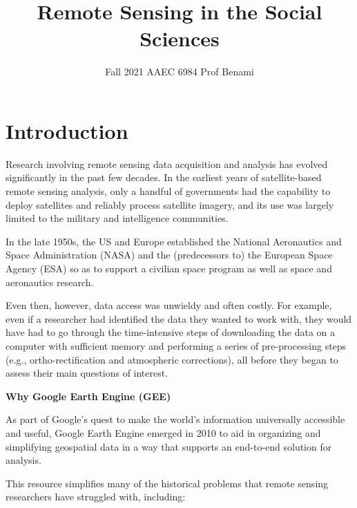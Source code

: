 \documentclass[
]{article}
\title{Remote Sensing in the Social Sciences}
\author{}
\date{\vspace{-2.5em}Fall 2021 \textbar{} AAEC 6984 \textbar{} Prof Benami}
\begin{document}
\maketitle

{
\setcounter{tocdepth}{2}
\tableofcontents
}
\hypertarget{introduction}{%
\section*{Introduction}\label{introduction}}

Research involving remote sensing data acquisition and analysis has evolved significantly in the past few decades. In the earliest years of satellite-based remote sensing analysis, only a handful of governments had the capability to deploy satellites and reliably process satellite imagery, and its use was largely limited to the military and intelligence communities.

In the late 1950s, the US and Europe established the National Aeronautics and Space Administration (NASA) and the (predecessors to) the European Space Agency (ESA) so as to support a civilian space program as well as space and aeronautics research.

Even then, however, data access was unwieldy and often costly. For example, even if a researcher had identified the data they wanted to work with, they would have had to go through the time-intensive steps of downloading the data on a computer with sufficient memory and performing a series of pre-processing steps (e.g., ortho-rectification and atmospheric corrections), all before they began to assess their main questions of interest.

\textbf{Why Google Earth Engine (GEE) }

As part of Google's quest to make the world's information universally accessible and useful, Google Earth Engine emerged in 2010 to aid in organizing and simplifying geospatial data in a way that supports an end-to-end solution for analysis.

This resource simplifies many of the historical problems that remote sensing researchers have struggled with, including:
\end{document}
